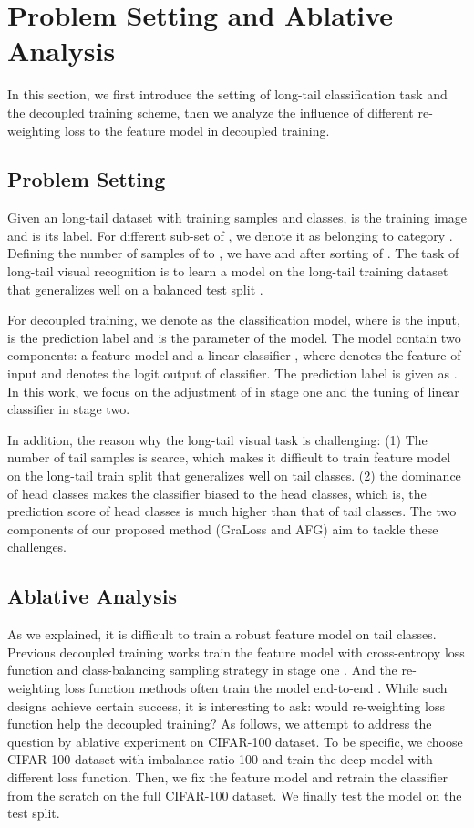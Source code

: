\documentclass[runningheads]{llncs}
\begin{document}
\section{Problem Setting and Ablative Analysis}
In this section, we first introduce the setting of long-tail classification task and the decoupled training scheme, then we analyze the influence of different re-weighting loss to the feature model in decoupled training. 

\subsection{Problem Setting}
Given an long-tail dataset  with  training samples and  classes,  is the training image and  is its label. For different sub-set of , we denote it as  belonging to category . Defining the number of samples of  to , we have  and  after sorting of . The task of long-tail visual recognition is to learn a model on the long-tail training dataset  that generalizes well on a balanced test split .

For decoupled training, we denote  as the classification model, where  is the input,  is the prediction label and  is the parameter of the model. The model  contain two components: a feature model  and a linear classifier , where  denotes the feature of input  and  denotes the logit output of classifier. The prediction label is given as . In this work, we focus on the adjustment of  in stage one and the tuning of linear classifier  in stage two.

In addition, the reason why the long-tail visual task is challenging: (1) The number of tail samples is scarce, which makes it difficult to train feature model  on the long-tail train split that generalizes well on tail classes. (2) the dominance of head classes makes the classifier biased to the head classes, which is, the prediction score of head classes is much higher than that of tail classes. The two components of our proposed method (GraLoss and AFG) aim to tackle these challenges.

\subsection{Ablative Analysis} \label{Ablative Analysis}
As we explained, it is difficult to train a robust feature model on tail classes. Previous decoupled training works train the feature model with cross-entropy loss function and class-balancing sampling strategy in stage one \cite{kang2019decoupling,vigneswaran2021feature,zhang2021distribution}. And the re-weighting loss function methods often train the model end-to-end \cite{cao2019learning,menon2020long,wang2021seesaw}. While such designs achieve certain success, it is interesting to ask: would re-weighting loss function help the decoupled training? As follows, we attempt to address the question by ablative experiment on CIFAR-100 dataset. To be specific, we choose CIFAR-100 dataset with imbalance ratio 100 and train the deep model with different loss function. Then, we fix the feature model and retrain the classifier from the scratch  on the full CIFAR-100 dataset. We finally test the model on the test split. 
\end{document}
